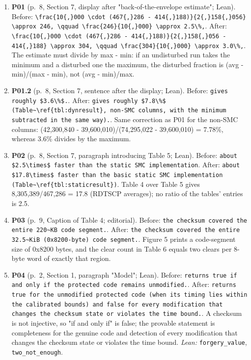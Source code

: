 \documentclass[9pt,twocolumn]{article}
\begin{document}
\begin{enumerate}[label=]
\item \textbf{P01} (p.~8, Section 7, display after "back-of-the-envelope estimate"; Lean). Before: \texttt{\textbackslash{}frac\{10\{,\}000 \textbackslash{}cdot (467\{,\}286 - 414\{,\}188)\}\{2\{,\}158\{,\}056\} \textbackslash{}approx 246, \textbackslash{}qquad \textbackslash{}frac\{246\}\{10\{,\}000\} \textbackslash{}approx 2.5\textbackslash{}\%,}. After: \texttt{\textbackslash{}frac\{10\{,\}000 \textbackslash{}cdot (467\{,\}286 - 414\{,\}188)\}\{2\{,\}158\{,\}056 - 414\{,\}188\} \textbackslash{}approx 304, \textbackslash{}qquad \textbackslash{}frac\{304\}\{10\{,\}000\} \textbackslash{}approx 3.0\textbackslash{}\%,}. The estimate must divide by max - min: if an undisturbed run takes the minimum and a disturbed one the maximum, the disturbed fraction is (avg - min)/(max - min), not (avg - min)/max. 
\item \textbf{P01.2} (p.~8, Section 7, sentence after the display; Lean). Before: \texttt{gives roughly \$3.6\textbackslash{}\%\$.}. After: \texttt{gives roughly \$7.8\textbackslash{}\%\$ (Table\~{}\textbackslash{}ref\{tbl:dynresult\}, non-SMC columns, with the minimum subtracted in the same way).}. Same correction as P01 for the non-SMC columns: (42,300,840 - 39,600,010)/(74,295,022 - 39,600,010) = 7.78\%, whereas 3.6\% divides by the maximum. 
\item \textbf{P02} (p.~8, Section 7, paragraph introducing Table 5; Lean). Before: \texttt{about \$2.5\textbackslash{}times\$ faster than the static SMC implementation}. After: \texttt{about \$17.8\textbackslash{}times\$ faster than the basic static SMC implementation (Table\~{}\textbackslash{}ref\{tbl:staticresult\})}. Table 4 over Table 5 gives 8,305,389/467,286 = 17.8 (RDTSCP averages); no ratio of the tables' entries is 2.5. 
\item \textbf{P03} (p.~9, Caption of Table 4; editorial). Before: \texttt{the checksum covered the entire 220\~{}KB code segment.}. After: \texttt{the checksum covered the entire 32.5\~{}KiB (0x8200-byte) code segment.}. Figure 5 prints a code-segment size of 0x8200 bytes, and the clear count in Table 6 equals two clears per 8-byte word of exactly that region. 
\item \textbf{P04} (p.~2, Section 1, paragraph "Model"; Lean). Before: \texttt{returns true if and only if the protected code remains unmodified.}. After: \texttt{returns true for the unmodified protected code (when its timing lies within the calibrated bounds) and false for every modification that changes the checksum state or violates the time bound.}. A checksum is not injective, so "if and only if" is false; the provable statement is completeness for the genuine code and detection of every modification that changes the checksum state or violates the time bound. \emph{Lean:} \texttt{forgery\_value}, \texttt{two\_not\_enough}. 

\end{enumerate}
\end{document}
